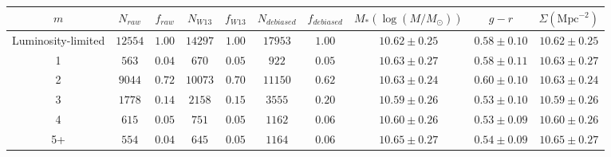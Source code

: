 \documentclass[useAMS,usenatbib]{mn2e}
\begin{document}
\begin{table}

\begin{tabular}{cccccccccc}
\hline
 $m$                    & $N_{raw}$   & $f_{raw}$   & $N_{W13}$   & $f_{W13}$   & $N_{debiased}$   & $f_{debiased}$   & $M_* (\log(M/M_{\odot}))$   & $g-r$            & $\Sigma \mathrm{(Mpc^{-2})}$  \\
\hline
 Luminosity-limited   & $12554$   & $1.00$    & $14297$   & $1.00$    & $17953$        & $1.00$         & $10.62\pm 0.25$                    & $0.58\pm 0.10$ & $10.62\pm 0.25$              \\
 1                    & $563$     & $0.04$    & $670$     & $0.05$    & $922$          & $0.05$         & $10.63\pm 0.27$                    & $0.58\pm 0.11$ & $10.63\pm 0.27$              \\
 2                    & $9044$    & $0.72$    & $10073$   & $0.70$    & $11150$        & $0.62$         & $10.63\pm 0.24$                    & $0.60\pm 0.10$ & $10.63\pm 0.24$              \\
 3                    & $1778$    & $0.14$    & $2158$    & $0.15$    & $3555$         & $0.20$         & $10.59\pm 0.26$                    & $0.53\pm 0.10$ & $10.59\pm 0.26$              \\
 4                    & $615$     & $0.05$    & $751$     & $0.05$    & $1162$         & $0.06$         & $10.60\pm 0.26$                    & $0.53\pm 0.09$ & $10.60\pm 0.26$              \\
 5+                   & $554$     & $0.04$    & $645$     & $0.05$    & $1164$         & $0.06$         & $10.65\pm 0.27$                    & $0.54\pm 0.09$ & $10.65\pm 0.27$              \\
 
\hline


\end{tabular}
\end{table}
\end{document}
